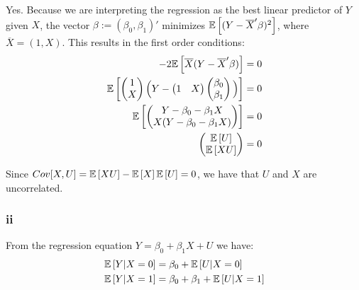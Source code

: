 \documentclass[12pt]{paper}
\begin{document}
Yes. Because we are interpreting the regression as the best linear predictor of $Y$ given $X$, the vector $\beta:=(\beta_0,\beta_1)'$ minimizes $\mathbb{E} \left [ (Y-\overline{X}'\beta)^2 \right ]$, where $\overline{X}=(1,X)$. This results in the first order conditions:
\begin{equation}
\begin{split}
-2\mathbb{E} \left [ \overline{X}(Y-\overline{X}'\beta) \right ]&=0\\
\mathbb{E} \left [ \begin{pmatrix}
1\\
X\\
\end{pmatrix}
\Big(Y-\begin{pmatrix}
1&X\\
\end{pmatrix}
\begin{pmatrix}
\beta_0\\
\beta_1\\
\end{pmatrix}\Big)
 \right ]&=0\\
\mathbb{E} \left [ \begin{pmatrix}
Y-\beta_0-\beta_1 X\\
X(Y-\beta_0-\beta_1 X)\\
\end{pmatrix}
 \right ]&=0\\
\begin{pmatrix}
\mathbb{E} \left [ U \right ]\\
\mathbb{E} \left [ XU \right ]\\
\end{pmatrix}
&=0\\
\end{split}
\end{equation}

Since $Cov[X,U]=\mathbb{E} \left [ XU \right ]-\mathbb{E} \left [ X \right ]\mathbb{E} \left [ U \right ]=0$, we have that $U$ and $X$ are uncorrelated.

\subsubsection*{ii}

From the regression equation $Y=\beta_0+\beta_1 X + U$ we have:
\begin{equation}
\begin{split}
\mathbb{E} \left [ Y|X=0 \right ]&=\beta_0+\mathbb{E} \left [ U|X=0 \right ]\\
\mathbb{E} \left [ Y|X=1 \right ]&=\beta_0+\beta_1+\mathbb{E} \left [ U|X=1 \right ]\\
\end{split}
\end{equation}
\end{document}
